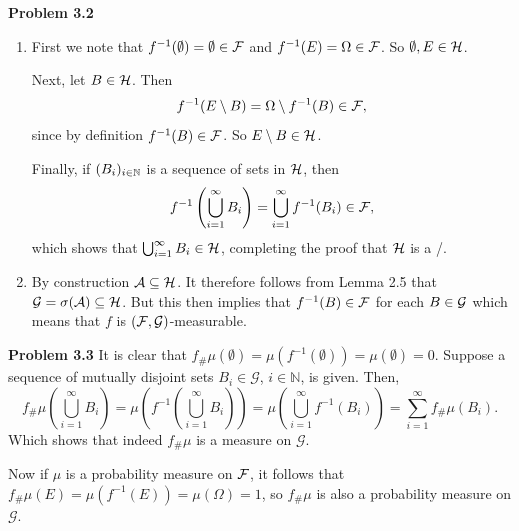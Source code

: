 
\textbf{Problem 3.2}

\begin{enumerate}[label=(\alph*)]
\item First we note that $f^{-1}(\emptyset) = \emptyset \in \mathcal F$ and $f^{-1}(E) = \Omega \in \mathcal F$. So $\emptyset, E \in \mathcal H$. 

Next, let $B \in \mathcal H$. Then
\[
	f^{-1}(E\setminus B) = \Omega \setminus f^{-1}(B) \in \mathcal F,
\]
since by definition $f^{-1}(B) \in \mathcal F$. So $E\setminus B \in \mathcal H$.

Finally, if $(B_i)_{i \in \mathbb N}$ is a sequence of sets in $\mathcal H$, then
\[
	f^{-1}\left(\bigcup_{i = 1}^\infty B_i\right) = \bigcup_{i = 1}^\infty f^{-1}(B_i) \in \mathcal F,
\]
which shows that $\bigcup_{i = 1}^\infty B_i \in \mathcal H$, completing the proof that $\mathcal H$ is a \sigalg/.
\item By construction $\mathcal A \subseteq \mathcal H$. It therefore follows from Lemma 2.5 that $\mathcal G = \sigma(\mathcal A) \subseteq \mathcal H$. But this then implies that $f^{-1}(B) \in \mathcal F$ for each $B \in \mathcal G$ which means that $f$ is $(\mathcal F, \mathcal G)$-measurable.
\end{enumerate}

\bigskip




\textbf{Problem 3.3}
It is clear that $f_{\#}\mu(\emptyset) = \mu(f^{-1}(\emptyset)) = \mu(\emptyset) = 0$. 
Suppose a sequence of mutually disjoint sets $B_i \in \mathcal{G}$, $i \in \mathbb{N}$, is given. Then,
\[
f_{\#} \mu\left( \bigcup_{i=1}^\infty B_i \right) = \mu\left( f^{-1} \left(\bigcup_{i=1}^\infty B_i \right) \right) = \mu \left( \bigcup_{i=1}^\infty  f^{-1}(B_i) \right) = \sum_{i=1}^\infty f_{\#}\mu (B_i).
\]
Which shows that indeed $f_{\#}\mu$ is a measure on $\mathcal{G}$.

Now if $\mu$ is a probability measure on $\mathcal F$, it follows that $f_{\#}\mu(E) = \mu(f^{-1}(E)) = \mu(\Omega) = 1$, so $f_{\#}\mu$ is also a probability measure on $\mathcal{G}$.
\bigskip

